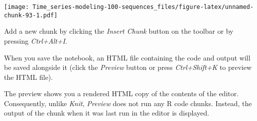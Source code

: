 \documentclass[
]{article}
\begin{document}
\texttt{[image: Time\_series-modeling-100-sequences\_files/figure-latex/unnamed-chunk-93-1.pdf]}

Add a new chunk by clicking the \emph{Insert Chunk} button on the
toolbar or by pressing \emph{Ctrl+Alt+I}.

When you save the notebook, an HTML file containing the code and output
will be saved alongside it (click the \emph{Preview} button or press
\emph{Ctrl+Shift+K} to preview the HTML file).

The preview shows you a rendered HTML copy of the contents of the
editor. Consequently, unlike \emph{Knit}, \emph{Preview} does not run
any R code chunks. Instead, the output of the chunk when it was last run
in the editor is displayed.
\end{document}
